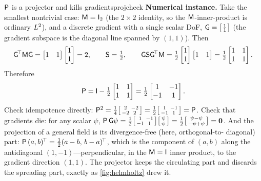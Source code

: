 \begin{workedexample}{$\mathsf{P}$ is a projector and kills gradients}{projcheck}
\medskip\noindent\textbf{Numerical instance.}
Take the smallest nontrivial case: $\mathsf{M}=\mathsf{I}_2$ (the $2\times2$ identity,
so the $\mathsf{M}$-inner-product is ordinary $L^2$), and a discrete gradient with
a single scalar DoF, $\mathsf{G}=\bigl[\begin{smallmatrix}1\\1\end{smallmatrix}\bigr]$
(the gradient subspace is the diagonal line spanned by $(1,1)$). Then
\[
  \mathsf{G}^{\!\top}\mathsf{M}\mathsf{G} = \begin{bmatrix}1&1\end{bmatrix}\begin{bmatrix}1\\1\end{bmatrix} = 2,
  \qquad \mathsf{S} = \tfrac12,
  \qquad
  \mathsf{G}\mathsf{S}\mathsf{G}^{\!\top}\mathsf{M}
  = \tfrac12\begin{bmatrix}1\\1\end{bmatrix}\begin{bmatrix}1&1\end{bmatrix}
  = \tfrac12\begin{bmatrix}1&1\\1&1\end{bmatrix}.
\]
Therefore
\[
  \mathsf{P} = \mathsf{I} - \tfrac12\begin{bmatrix}1&1\\1&1\end{bmatrix}
          = \tfrac12\begin{bmatrix}1&-1\\-1&1\end{bmatrix}.
\]
Check idempotence directly:
$\mathsf{P}^2=\tfrac14\bigl[\begin{smallmatrix}2&-2\\-2&2\end{smallmatrix}\bigr]
=\tfrac12\bigl[\begin{smallmatrix}1&-1\\-1&1\end{smallmatrix}\bigr]=\mathsf{P}$. Check
that gradients die: for any scalar $\psi$,
$\mathsf{P}\,\mathsf{G}\psi = \tfrac12\bigl[\begin{smallmatrix}1&-1\\-1&1\end{smallmatrix}\bigr]
\bigl[\begin{smallmatrix}\psi\\\psi\end{smallmatrix}\bigr]
= \tfrac12\bigl[\begin{smallmatrix}\psi-\psi\\-\psi+\psi\end{smallmatrix}\bigr]=\mathbf{0}$.
And the projection of a general field is its divergence-free (here, orthogonal-to-
diagonal) part: $\mathsf{P}\,(a,b)^{\!\top}=\tfrac12(a-b,\,b-a)^{\!\top}$, which is
the component of $(a,b)$ along the antidiagonal $(1,-1)$---perpendicular, in the
$\mathsf{M}=\mathsf{I}$ inner product, to the gradient direction $(1,1)$. The projector
keeps the circulating part and discards the spreading part, exactly as
\cref{fig:helmholtz} drew it.
\end{workedexample}

